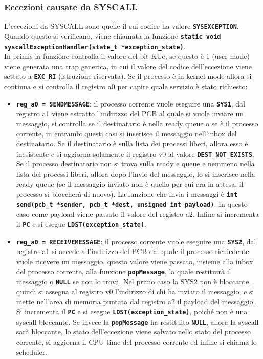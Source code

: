 \documentclass{article}
\begin{document}
	\subsubsection{Eccezioni causate da SYSCALL}
	L'eccezioni da SYSCALL sono quelle il cui codice ha valore \texttt{\textbf{SYSEXCEPTION}}.
	Quando queste si verificano, viene chiamata la funzione \texttt{\textbf{static
	void syscallExceptionHandler(state\_t *exception\_state)}}. \\In primis la
	funzione controlla il valore del bit KUc, se questo è 1 (user-mode) viene generata
	una trap generica, in cui il valore del codice dell'eccezione viene settato a
	\texttt{\textbf{EXC\_RI}} (istruzione riservata). Se il processo è in kernel-mode
	allora si continua e si controlla il registro a0 per capire quale servizio è
	stato richiesto:
	\begin{itemize}
		\item \texttt{\textbf{reg\_a0 = SENDMESSAGE}}: il processo corrente vuole eseguire
			una \texttt{\textbf{SYS1}}, dal registro a1 viene estratto l'indirizzo del
			PCB al quale si vuole inviare un messaggio, si controlla se il
			destinatario è nella ready queue o se è il processo corrente, in entrambi questi
			casi si inserisce il messaggio nell'inbox del destinatario. Se il
			destinatario è sulla lista dei processi liberi, allora esso è inesistente e
			si aggiorna solamente il registro v0 al valore \texttt{\textbf{DEST\_NOT\_EXISTS}}.
			Se il processo destinatario non si trova sulla ready e queue e nemmeno nella
			lista dei processi liberi, allora dopo l'invio del messaggio, lo si inserisce
			nella ready queue (se il messaggio inviato non è quello per cui era in
			attesa, il processo si bloccherà di nuovo). La funzione che invia i messaggi
			è \texttt{\textbf{int send(pcb\_t *sender, pcb\_t *dest, unsigned int
			payload)}}. In questo caso come payload viene passato il valore del registro
			a2. Infine si incrementa il \texttt{\textbf{PC}} e si esegue \texttt{\textbf{LDST(exception\_state)}}.

		\item \texttt{\textbf{reg\_a0 = RECEIVEMESSAGE}}: il processo corrente vuole
			eseguire una \texttt{\textbf{SYS2}}, dal registro a1 si accede all'indirizzo
			del PCB dal quale il processo richiedente vuole ricevere un messaggio,
			questo valore viene passato, insieme alla inbox del processo corrente,
			alla funzione \texttt{\textbf{popMessage}}, la quale restituirà il
			messaggio o \texttt{\textbf{NULL}} se non lo trova. Nel primo caso la SYS2
			non è bloccante, quindi si assegna al registro v0 l'indirizzo di chi ha inviato
			il messaggio, e si mette nell'area di memoria puntata dal registro a2 il
			payload del messaggio. Si incrementa il \texttt{\textbf{PC}} e si esegue
			\texttt{\textbf{LDST(exception\_state)}}, poiché non è una syscall
			bloccante. Se invece la \texttt{\textbf{popMessage}} ha restituito \texttt{\textbf{NULL}},
			allora la syscall sarà bloccante, lo stato dell'eccezione viene salvato nello
			stato del processo corrente, si aggiorna il CPU time del processo corrente
			ed infine si chiama lo scheduler.


\end{itemize}
\end{document}
